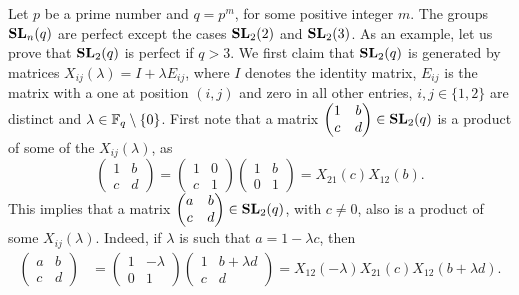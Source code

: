 Let $p$ be a prime number and $q=p^m$, for some positive integer $m$.  
The groups $\mathbf{SL}_n(q)$ are perfect except the cases $\mathbf{SL}_2(2)$ and $\mathbf{SL}_2(3)$. As an example,
let us prove that $\mathbf{SL}_2(q)$ is perfect if $q>3$. We first 
claim that $\mathbf{SL}_2(q)$ is generated by matrices
$X_{ij}(\lambda)=I+\lambda E_{ij}$, where $I$ denotes the identity matrix, 
$E_{ij}$ is the matrix with a one at position $(i,j)$ and zero in all other entries, 
$i,j\in\{1,2\}$ are distinct and $\lambda\in\mathbb{F}_q\setminus\{0\}$. First note that
a matrix $\begin{pmatrix}1&b\\c&d\end{pmatrix}\in\mathbf{SL}_2(q)$ is 
a product of some of the $X_{ij}(\lambda)$, as 
\[
\begin{pmatrix}
1&b\\
c&d	
\end{pmatrix}
=\begin{pmatrix}
1&0\\
c&1
\end{pmatrix}
\begin{pmatrix}
1&b\\
0&1	
\end{pmatrix}
=X_{21}(c)X_{12}(b).
\]
This implies that a matrix $\begin{pmatrix}a&b\\c&d\end{pmatrix}\in\mathbf{SL}_2(q)$, 
with $c\ne 0$, also is a product
of some $X_{ij}(\lambda)$. Indeed, if
$\lambda$ is such that $a=1-\lambda c$, then
\begin{align*}
\begin{pmatrix}
a&b\\
c&d	
\end{pmatrix}
&=\begin{pmatrix}
1&-\lambda\\
0&1	
\end{pmatrix}
\begin{pmatrix}
1&b+\lambda d\\
c&d	
\end{pmatrix}
=X_{12}(-\lambda)X_{21}(c)X_{12}(b+\lambda d).
\end{align*}
